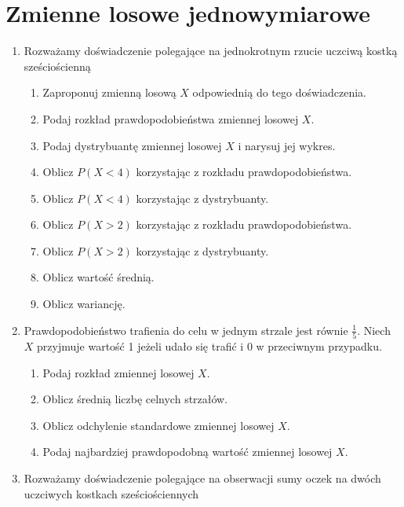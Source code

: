 \documentclass{mwart}
\newcommand{\ans}[1]{}
\newcommand{\ans}[1]{\emph{Odpowiedź:} #1}
\begin{document}
\clearpage
\section{Zmienne losowe jednowymiarowe}
\begin{enumerate}
\item Rozważamy doświadczenie polegające na jednokrotnym rzucie uczciwą kostką sześciościenną
\begin{enumerate}
\item Zaproponuj zmienną losową $X$ odpowiednią do tego doświadczenia. \ans{$X\colon\Omega\to\{1,\ldots,6\}$}
\item Podaj rozkład prawdopodobieństwa zmiennej losowej $X$. \ans{$P(X=i)=\frac{1}{6}$}
\item Podaj dystrybuantę zmiennej losowej $X$ i narysuj jej wykres.
\item Oblicz $P(X<4)$ korzystając z rozkładu prawdopodobieństwa. \ans{$P(X<4)=P(X=1)+P(X=2)+P(X=3)$}
\item Oblicz $P(X<4)$ korzystając z dystrybuanty. \ans{$P(X<4)=F_X(4)$}
\item Oblicz $P(X>2)$ korzystając z rozkładu prawdopodobieństwa. \ans{$P(X>2)=P(X=3)+\ldots+P(X=6)$}
\item Oblicz $P(X>2)$ korzystając z dystrybuanty. \ans{$P(X>2)=1-P(X\leq 2)=1-P(X<3)=1-F(3)$}
\item Oblicz wartość średnią. \ans{$EX=\frac{21}{6}=3{,}5$}
\item Oblicz wariancję. \ans{$D^2X=\frac{1}{6}((-2{,}5)^2+(-1{,}5)^2+(-0{,}5)^2+2{,}5^2+1{,}5^2+0{,}5^2)$}
\end{enumerate}
\item Prawdopodobieństwo trafienia do celu w jednym strzale jest równie $\frac{1}{5}$. Niech $X$ przyjmuje wartość 1 jeżeli udało się trafić i 0 w przeciwnym przypadku.
\begin{enumerate}
\item Podaj rozkład zmiennej losowej $X$. \ans{$P(X=1)=p\quad P(X=0)=1-p$}
\item Oblicz średnią liczbę celnych strzałów. \ans{$EX=p=0{,}2$}
\item Oblicz odchylenie standardowe zmiennej losowej $X$. \ans{$DX=\sqrt{p(1-p)}=0{,}4$}
\item Podaj najbardziej prawdopodobną wartość zmiennej losowej $X$. \ans{$0$}
\end{enumerate}
\item Rozważamy doświadczenie polegające na obserwacji sumy oczek na dwóch uczciwych kostkach sześciościennych

\end{enumerate}
\end{document}
